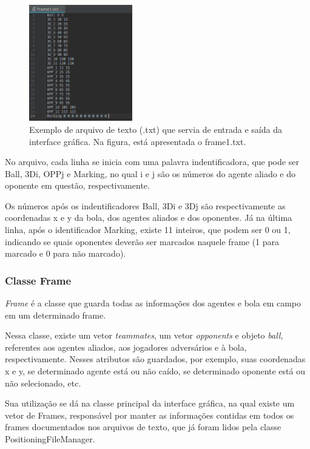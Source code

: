 \documentclass[a4paper,12pt]{article}
\begin{document}
\begin{figure}[H]
	\centering
	\includegraphics[width=0.4\textwidth]{figures/frame1-txt.png}
   \caption{Exemplo de arquivo de texto (.txt) que servia de entrada e saída da interface gráfica. Na figura, está apresentada o frame1.txt.} \label{fig:frame1-txt}
\end{figure}

No arquivo, cada linha se inicia com uma palavra indentificadora, que pode ser Ball, 3D\underline{\space}i, OPP\underline{\space}j e Marking, no qual i e j são os números do agente aliado e do oponente em questão, respectivamente.

Os números após os indentificadores Ball, 3D\underline{\space}i e 3D\underline{\space}j são respectivamente as coordenadas x e y da bola, dos agentes aliados e dos oponentes. Já na última linha, após o identificador Marking, existe 11 inteiros, que podem ser 0 ou 1, indicando se quais oponentes deverão ser marcados naquele frame (1 para marcado e 0 para não marcado).

\subsubsection{Classe Frame}
\textit{Frame} é a classe que guarda todas as informações dos agentes e bola em campo em um determinado frame.

Nessa classe, existe um vetor \textit{teammates}, um vetor \textit{opponents} e objeto \textit{ball}, referentes aos agentes aliados, aos jogadores adversários e à bola, respectivamente. Nesses atributos são guardados, por exemplo, suas coordenadas x e y, se determinado agente está ou não caído, se determinado oponente está ou não selecionado, etc.

Sua utilização se dá na classe principal da interface gráfica, na qual existe um vetor de Frames, responsável por manter as informações contidas em todos os frames documentados nos arquivos de texto, que já foram lidos pela classe PositioningFileManager.
\end{document}

